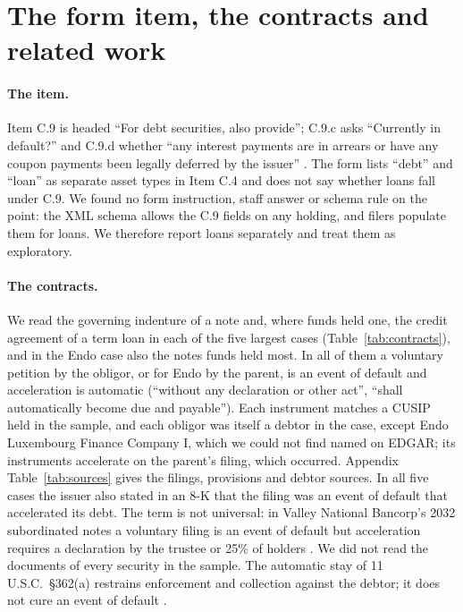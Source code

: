 \documentclass[11pt]{article}
\begin{document}
\section{The form item, the contracts and related work}\label{sec:item}

\paragraph{The item.} Item C.9 is headed ``For debt securities, also provide''; C.9.c asks ``Currently
in default?'' and C.9.d whether ``any interest payments are in arrears or have any coupon payments been
legally deferred by the issuer'' \citep{sec_nport_form}. The form lists ``debt'' and ``loan'' as separate
asset types in Item C.4 and does not say whether loans fall under C.9. We found no form instruction,
staff answer or schema rule on the point: the XML schema allows the C.9 fields on any holding, and
filers populate them for loans. We therefore report loans separately and treat them as exploratory.

\paragraph{The contracts.} We read the governing indenture of a note and, where funds held one, the
credit agreement of a term loan in each of the five largest cases (Table~\ref{tab:contracts}), and in
the Endo case also the notes funds held most. In all of them a voluntary petition by the obligor, or
for Endo by the parent, is an event of default and acceleration is automatic (``without any declaration
or other act'', ``shall automatically become due and payable''). Each instrument matches a CUSIP held in
the sample, and each obligor was itself a debtor in the case, except Endo Luxembourg Finance Company I,
which we could not find named on EDGAR; its instruments accelerate on the parent's filing, which
occurred. Appendix Table~\ref{tab:sources} gives the filings, provisions and debtor sources. In all
five cases the issuer also stated in an 8-K that the filing was an event of default that accelerated
its debt. The term is
not universal: in Valley National Bancorp's 2032 subordinated notes a voluntary filing is an event of
default but acceleration requires a declaration by the trustee or 25\% of holders \citep{valley2022}. We
did not read the documents of every security in the sample. The automatic stay of 11 U.S.C.~\S362(a)
restrains enforcement and collection against the debtor; it does not cure an event of default
\citep{usc362, uscourts_ch11}.
\end{document}
